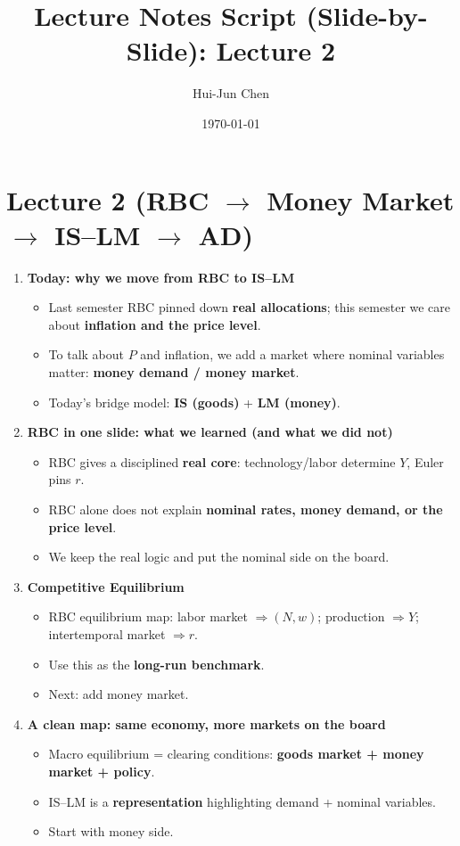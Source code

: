 \documentclass[11pt]{article}
\title{Lecture Notes Script (Slide-by-Slide): Lecture 2}
\author{Hui-Jun Chen}
\date{\today}
\begin{document}
\maketitle

\section*{Lecture 2 (RBC $\rightarrow$ Money Market $\rightarrow$ IS--LM $\rightarrow$ AD)}

\begin{enumerate}
\item \textbf{Today: why we move from RBC to IS--LM}
\begin{itemize}
\item Last semester RBC pinned down \textbf{real allocations}; this semester we care about \textbf{inflation and the price level}.
\item To talk about $P$ and inflation, we add a market where nominal variables matter: \textbf{money demand / money market}.
\item Today’s bridge model: \textbf{IS (goods)} + \textbf{LM (money)}.
\end{itemize}

\item \textbf{RBC in one slide: what we learned (and what we did not)}
\begin{itemize}
\item RBC gives a disciplined \textbf{real core}: technology/labor determine $Y$, Euler pins $r$.
\item RBC alone does not explain \textbf{nominal rates, money demand, or the price level}.
\item We keep the real logic and put the nominal side on the board.
\end{itemize}

\item \textbf{Competitive Equilibrium}
\begin{itemize}
\item RBC equilibrium map: labor market $\Rightarrow (N,w)$; production $\Rightarrow Y$; intertemporal market $\Rightarrow r$.
\item Use this as the \textbf{long-run benchmark}.
\item Next: add money market.
\end{itemize}

\item \textbf{A clean map: same economy, more markets on the board}
\begin{itemize}
\item Macro equilibrium = clearing conditions: \textbf{goods market + money market + policy}.
\item IS--LM is a \textbf{representation} highlighting demand + nominal variables.
\item Start with money side.
\end{itemize}


\end{enumerate}
\end{document}

